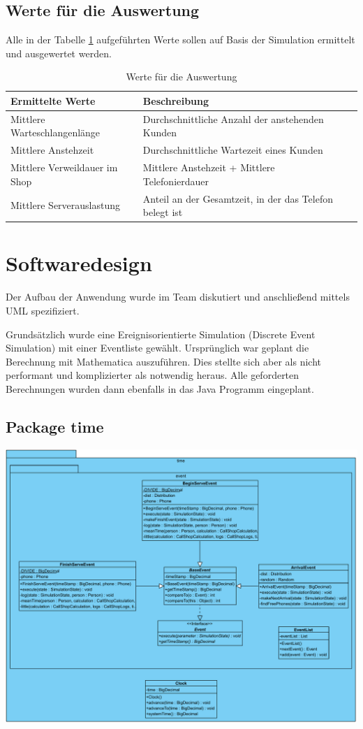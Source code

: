 \subsection{Werte für die Auswertung}
Alle in der Tabelle \ref{tab:WerteAuswertung} aufgeführten Werte sollen auf Basis der Simulation ermittelt und ausgewertet werden.
\begin{table}[htpb]
	\centering
	\begin{tabular}{lll}
		Ermittelte Werte & Beschreibung \\ \hline
		Mittlere Warteschlangenlänge & Durchschnittliche Anzahl der anstehenden Kunden \\
		Mittlere Anstehzeit & Durchschnittliche Wartezeit eines Kunden \\
		Mittlere Verweildauer im Shop & Mittlere Anstehzeit + Mittlere Telefonierdauer\\
		Mittlere Serverauslastung & Anteil an der Gesamtzeit, in der das Telefon belegt ist\\
	\end{tabular}
	\caption{Werte für die Auswertung}
	\label{tab:WerteAuswertung}
\end{table}


\section{Softwaredesign}

Der Aufbau der Anwendung wurde im Team diskutiert und anschließend mittels UML spezifiziert.

Grundsätzlich wurde eine Ereignisorientierte Simulation (Discrete Event Simulation) mit einer Eventliste gewählt. Ursprünglich war geplant die Berechnung mit Mathematica auszuführen. Dies stellte sich aber als nicht performant und komplizierter als notwendig heraus. Alle geforderten Berechnungen wurden dann ebenfalls in das Java Programm eingeplant.

\subsection{Package time}

\includegraphics[scale=0.5]{abbildungen/uml/time.pdf}

